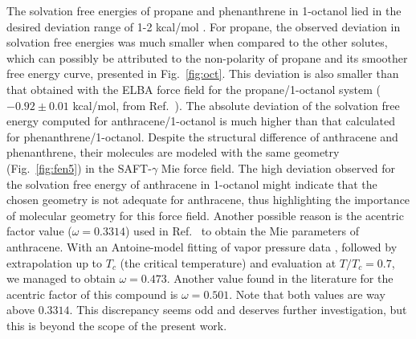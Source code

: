 \documentclass[preprint]{elsarticle}
\begin{document}
	The solvation free energies of propane and phenanthrene in 1-octanol lied in the desired deviation range of 1-2 kcal/mol \cite{doimobley}. For propane, the observed deviation in solvation free energies was much smaller when compared to the other solutes, which can possibly be attributed to the non-polarity of propane and its smoother free energy curve, presented in Fig.~\ref{fig:oct}. This deviation is also smaller than that obtained with the ELBA force field for the propane/1-octanol system ($-0.92 \pm 0.01$ kcal/mol, from Ref.~). The absolute deviation of the solvation free energy computed for anthracene/1-octanol is much higher than that calculated for phenanthrene/1-octanol. Despite the structural difference of anthracene and phenanthrene, their molecules are modeled with the same geometry (Fig.~\ref{fig:fen5}) in the SAFT-$\gamma$ Mie force field. The high deviation observed for the solvation free energy of anthracene in 1-octanol might indicate that the chosen geometry is not adequate for anthracene, thus highlighting the importance of molecular geometry for this force field.
	Another possible reason is the acentric factor value ($\omega=0.3314$) used in Ref.~ to obtain the Mie parameters of anthracene.
	With an Antoine-model fitting of vapor pressure data \cite{murphy}, followed by extrapolation up to $T_c$ (the critical temperature) \cite{muller2017} and evaluation at $T/T_c=0.7$, we managed to obtain $\omega=0.473$.
	Another value found in the literature \cite{poling2000properties} for the acentric factor of this compound is $\omega=0.501$.
	Note that both values are way above $0.3314$.
	This discrepancy seems odd and deserves further investigation, but this is beyond the scope of the present work.
\end{document}
